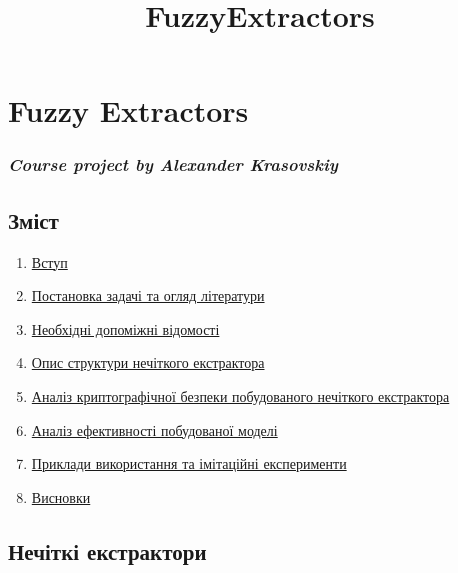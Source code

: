 \documentclass[11pt]{article}
\title{FuzzyExtractors}
\providecommand{\tightlist}{%
      \setlength{\itemsep}{0pt}\setlength{\parskip}{0pt}}
\begin{document}
    
    \maketitle
    
    

    
    \hypertarget{fuzzy-extractors}{%
\section{Fuzzy Extractors}\label{fuzzy-extractors}}

\hypertarget{course-project-by-alexander-krasovskiy}{%
\subsubsection{\texorpdfstring{\emph{Course project by Alexander
Krasovskiy}}{Course project by Alexander Krasovskiy}}\label{course-project-by-alexander-krasovskiy}}

    \hypertarget{ux437ux43cux456ux441ux442}{%
\subsection{Зміст}\label{ux437ux43cux456ux441ux442}}

\begin{enumerate}
\def\labelenumi{\arabic{enumi}.}
\tightlist
\item
  \hyperref[нечіткі-екстрактори]{Вступ}
\item
  \hyperref[постановка-задачі-та-огляд-літератури]{Постановка задачі та огляд літератури}
\item
  \hyperref[необхідні-допоміжні-відомості]{Необхідні допоміжні відомості}
\item
  \hyperref[опис-структури-нечіткого-екстрактора]{Опис структури нечіткого екстрактора}
\item
  \hyperref[аналіз-криптографічної-безпеки-побудованого-нечіткого-екстрактора]{Аналіз криптографічної безпеки побудованого нечіткого екстрактора}
\item
  \hyperref[аналіз-ефективності-побудованої-моделі]{Аналіз ефективності побудованої моделі}
\item
  \hyperref[приклади-використання]{Приклади використання та імітаційні експерименти}
\item
  \hyperref[висновки]{Висновки}
\end{enumerate}

    \hypertarget{ux43dux435ux447ux456ux442ux43aux456-ux435ux43aux441ux442ux440ux430ux43aux442ux43eux440ux438}{%
\subsection{Нечіткі
екстрактори}\label{ux43dux435ux447ux456ux442ux43aux456-ux435ux43aux441ux442ux440ux430ux43aux442ux43eux440ux438}}
\end{document}
